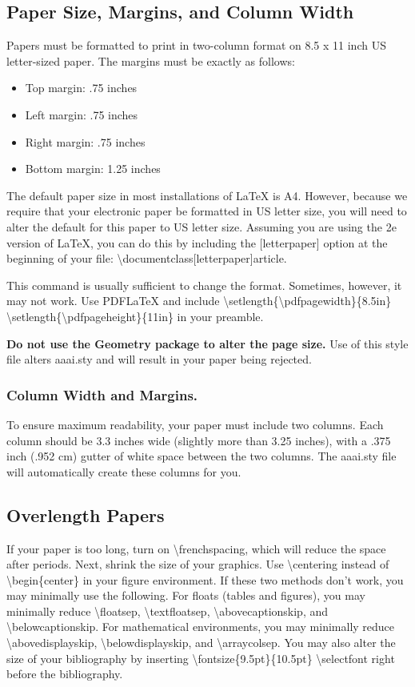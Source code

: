 \documentclass[letterpaper]{article}
\begin{document}
	\subsection{Paper Size, Margins, and Column Width}
	Papers must be formatted to print in two-column format on 8.5 x 11 inch US letter-sized paper. The margins must be exactly as follows: 
	\begin{itemize}
		\item Top margin: .75 inches
		\item Left margin: .75 inches
		\item Right margin: .75 inches
		\item Bottom margin: 1.25 inches
	\end{itemize} 
	
	
	The default paper size in most installations of \LaTeX{} is A4. However, because we require that your electronic paper be formatted in US letter size, you will need to alter the default for this paper to US letter size. Assuming you are using the 2e version of \LaTeX{}, you can do this by including the [letterpaper] option at the beginning of your file: 
	\textbackslash documentclass[letterpaper]{article}. 
	
	This command is usually sufficient to change the format. Sometimes, however, it may not work. Use PDF\LaTeX{} and include
	\textbackslash setlength\{\textbackslash pdfpagewidth\}\{8.5in\}
	\textbackslash setlength\{\textbackslash pdfpageheight\}\{11in\}
	in your preamble. 
	
	\textbf{Do not use the Geometry package to alter the page size.} Use of this style file alters aaai.sty and will result in your paper being rejected. 
	
	
	\subsubsection{Column Width and Margins.}
	To ensure maximum readability, your paper must include two columns. Each column should be 3.3 inches wide (slightly more than 3.25 inches), with a .375 inch (.952 cm) gutter of white space between the two columns. The aaai.sty file will automatically create these columns for you. 
	
	\subsection{Overlength Papers}
	If your paper is too long, turn on \textbackslash frenchspacing, which will reduce the space after periods. Next,  shrink the size of your graphics. Use \textbackslash centering instead of \textbackslash begin\{center\} in your figure environment. If these two methods don't work, you may minimally use the following. For floats (tables and figures), you may minimally reduce \textbackslash floatsep, \textbackslash textfloatsep, \textbackslash abovecaptionskip, and \textbackslash belowcaptionskip. For mathematical environments, you may minimally reduce \textbackslash abovedisplayskip, \textbackslash belowdisplayskip, and \textbackslash arraycolsep. You may also alter the size of your bibliography by inserting \textbackslash fontsize\{9.5pt\}\{10.5pt\} \textbackslash selectfont
	right before the bibliography. 
	
\end{document}
